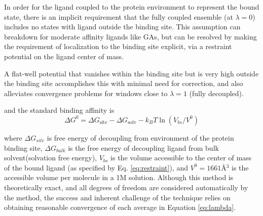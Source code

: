 \documentclass[12pt]{article}
\begin{document}
In order for the ligand coupled to the protein environment to represent the bound state, there is an implicit requirement that the fully coupled ensemble (at $\lambda=0$) includes no states with ligand outside the binding site. This assumption can breakdown for moderate affinity ligands like GAs, but can be resolved by making the requirement of localization to the binding site explicit, via a restraint potential on the ligand center of mass.  

A flat-well potential that vanishes within the binding site but is very high outside the binding site accomplishes this with minimal need for correction, and also alleviates convergence problems for windows close to $\lambda=1$ (fully decoupled).  

and the standard binding affinity is 
		\begin{equation}
	  		\Delta G^{0}=\Delta G_{\mathrm{site}}-\Delta G_{\mathrm{solv}}-k_{B}T  \ln (V_{bs} /V^{0})	\label{eq:deltag}
		\end{equation} 

		where $\Delta G_{site}$ is free energy of decoupling from environment of the protein binding site,  $\Delta G_{bulk}$ is the free energy of decoupling ligand from bulk solvent(solvation free energy), $V_{bs}$ is the volume accessible to the center of mass of the bound ligand (as specified by Eq. \ref{eq:restraint}), and $V^{0} = 1661 $\AA$^{3}$ is the accessible volume per molecule in a 1M solution.  Although this method is theoretically exact, and all degrees of freedom are considered automatically by the method, the success and inherent challenge of the technique relies on obtaining reasonable convergence of each average in Equation \ref{eq:lambda}. 
		
\end{document}
